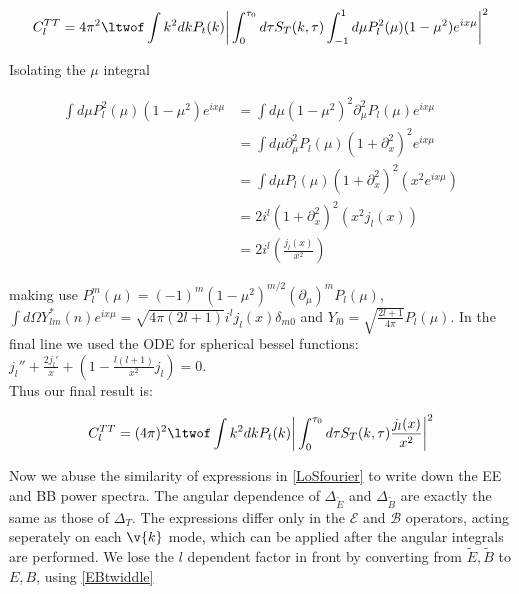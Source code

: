 \begin{equation}\begin{split}
C_l^{TT} = 4\pi^2\ltwof \int k^2 dk P_t(k) \bigg|  \int_0^{\tau_0} d\tau  S_T(k,\tau)\int_{-1}^1 d\mu P_l^2(\mu)(1-\mu^2)e^{ix\mu} \bigg|^2
\end{split}\end{equation}

Isolating the $\mu$ integral

\begin{equation}\begin{split}
\int d\mu P_l^2(\mu)(1-\mu^2)e^{ix\mu} 
&= \int d\mu(1-\mu^2)^2 \partial_\mu^2P_l(\mu)e^{ix\mu}\\
&= \int d\mu \partial_\mu^2P_l(\mu)(1+\partial_x^2)^2e^{ix\mu}\\
&= \int d\mu P_l(\mu)(1+\partial_x^2)^2(x^2e^{ix\mu})\\
&= 2i^l(1+\partial_x^2)^2(x^2j_l(x))\\
&= 2i^l(\frac{j_l(x)}{x^2})
\end{split}\end{equation}

making use $P^m_l(\mu)=(-1)^m(1-\mu^2)^{m/2}(\partial_\mu)^mP_l(\mu)$, $\int d\Omega Y_{lm}^*(\unit{n})e^{ix\mu} = \sqrt{4\pi(2l+1)}i^l j_l(x) \delta_{m0}$ and $Y_{l0} = \sqrt{\frac{2l+1}{4\pi}}P_l(\mu)$. In the final line we used the ODE for spherical bessel functions: $j_l''+\frac{2j_l'}{x}+(1-\frac{l(l+1)}{x^2}j_l)=0$.\\

Thus our final result is:

\begin{equation}\begin{split}
C_l^{TT} = (4\pi)^2\ltwof \int k^2 dk P_t(k) \bigg|  \int_0^{\tau_0}d\tau  S_T(k,\tau)\frac{j_l(x)}{x^2} \bigg|^2
\end{split}\end{equation}

Now we abuse the similarity of expressions in \ref{LoSfourier} to write down the EE and BB power spectra. The angular dependence of $\Delta_{\tilde{E}}$ and $\Delta_{\tilde{B}}$ are exactly the same as those of $\Delta_T$. The expressions differ only in the $\mathcal{E}$ and $\mathcal{B}$ operators, acting seperately on each $\v{k}$ mode, which can be applied after the angular integrals are performed. We lose the $l$ dependent factor in front by converting from $\tilde{E}, \tilde{B}$ to $E,B$, using \ref{EBtwiddle}


